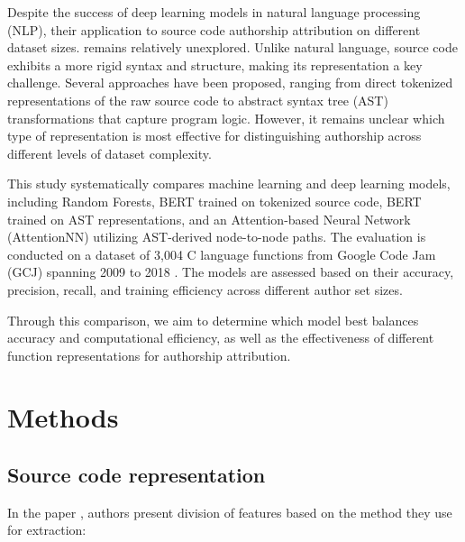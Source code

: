 \documentclass{article}
\begin{document}
Despite the success of deep learning models in natural language 
processing (NLP), their application to source code authorship attribution on different dataset sizes. 
remains relatively unexplored. Unlike natural language, source code 
exhibits a more rigid syntax and structure, making its representation 
a key challenge. Several approaches have been proposed, ranging from 
direct tokenized representations of the raw source code to abstract 
syntax tree (AST) transformations that capture program logic. However, 
it remains unclear which type of representation is most effective for 
distinguishing authorship across different levels of dataset complexity.

This study systematically compares machine learning and deep learning 
models, including Random Forests, BERT trained on tokenized source code, 
BERT trained on AST representations, and an Attention-based Neural Network 
(AttentionNN) utilizing AST-derived node-to-node paths. The evaluation is 
conducted on a dataset of 3,004 C language functions from Google Code Jam 
(GCJ) spanning 2009 to 2018 \cite{gcj}. The models are assessed based on their 
accuracy, precision, recall, and training efficiency across different 
author set sizes.

Through this comparison, we aim to determine which model best balances 
accuracy and computational efficiency, as well as the effectiveness of 
different function representations for authorship attribution.

\section{Methods}

\subsection{Source code representation}

In the paper \cite{information}, authors present division of features based on the method they use for extraction: 
    
\end{document}
